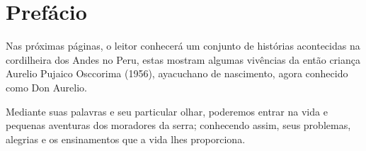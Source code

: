 \cleardoublepage
\newpage
\thispagestyle{empty}
\vfill


\chapter*{Prefácio} %

Nas próximas páginas, o leitor conhecerá um conjunto de histórias acontecidas na cordilheira dos Andes no Peru, estas mostram algumas vivências da então criança Aurelio Pujaico Osccorima (1956), %
ayacuchano de nascimento,
agora conhecido como Don Aurelio.

Mediante suas palavras e seu particular olhar, poderemos entrar na vida e pequenas aventuras dos moradores da serra; conhecendo assim, seus problemas, alegrias e os ensinamentos que a vida lhes proporciona. 
\vfill

\newpage
\thispagestyle{empty}
